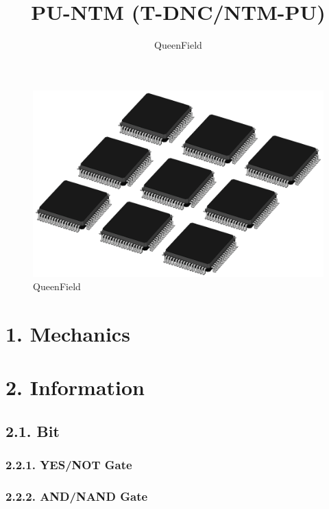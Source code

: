 \documentclass[
]{article}
\title{PU-NTM (T-DNC/NTM-PU)}
\author{QueenField}
\date{}
\begin{document}
\maketitle

\begin{figure}
\centering
\includegraphics{../icon.jpg}
\caption{QueenField}
\end{figure}

\hypertarget{mechanics}{%
\section{1. Mechanics}\label{mechanics}}

\hypertarget{information}{%
\section{2. Information}\label{information}}

\hypertarget{bit}{%
\subsection{2.1. Bit}\label{bit}}

\hypertarget{yesnot-gate}{%
\subsubsection{2.2.1. YES/NOT Gate}\label{yesnot-gate}}

\hypertarget{andnand-gate}{%
\subsubsection{2.2.2. AND/NAND Gate}\label{andnand-gate}}
\end{document}
